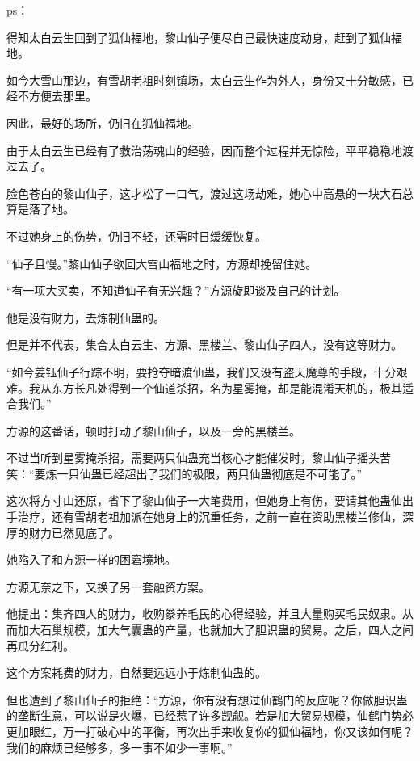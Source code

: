 
\begin{this_body}



ps：

得知太白云生回到了狐仙福地，黎山仙子便尽自己最快速度动身，赶到了狐仙福地。

如今大雪山那边，有雪胡老祖时刻镇场，太白云生作为外人，身份又十分敏感，已经不方便去那里。

因此，最好的场所，仍旧在狐仙福地。

由于太白云生已经有了救治荡魂山的经验，因而整个过程并无惊险，平平稳稳地渡过去了。

脸色苍白的黎山仙子，这才松了一口气，渡过这场劫难，她心中高悬的一块大石总算是落了地。

不过她身上的伤势，仍旧不轻，还需时日缓缓恢复。

“仙子且慢。”黎山仙子欲回大雪山福地之时，方源却挽留住她。

“有一项大买卖，不知道仙子有无兴趣？”方源旋即谈及自己的计划。

他是没有财力，去炼制仙蛊的。

但是并不代表，集合太白云生、方源、黑楼兰、黎山仙子四人，没有这等财力。

“如今姜钰仙子行踪不明，要抢夺暗渡仙蛊，我们又没有盗天魔尊的手段，十分艰难。我从东方长凡处得到一个仙道杀招，名为星雾掩，却是能混淆天机的，极其适合我们。”

方源的这番话，顿时打动了黎山仙子，以及一旁的黑楼兰。

不过当听到星雾掩杀招，需要两只仙蛊充当核心才能催发时，黎山仙子摇头苦笑：“要炼一只仙蛊已经超出了我们的极限，两只仙蛊彻底是不可能了。”

这次将方寸山还原，省下了黎山仙子一大笔费用，但她身上有伤，要请其他蛊仙出手治疗，还有雪胡老祖加派在她身上的沉重任务，之前一直在资助黑楼兰修仙，深厚的财力已然见底了。

她陷入了和方源一样的困窘境地。

方源无奈之下，又换了另一套融资方案。

他提出：集齐四人的财力，收购豢养毛民的心得经验，并且大量购买毛民奴隶。从而加大石巢规模，加大气囊蛊的产量，也就加大了胆识蛊的贸易。之后，四人之间再瓜分红利。

这个方案耗费的财力，自然要远远小于炼制仙蛊的。

但也遭到了黎山仙子的拒绝：“方源，你有没有想过仙鹤门的反应呢？你做胆识蛊的垄断生意，可以说是火爆，已经惹了许多觊觎。若是加大贸易规模，仙鹤门势必更加眼红，万一打破心中的平衡，再次出手来收复你的狐仙福地，你又该如何呢？我们的麻烦已经够多，多一事不如少一事啊。”


\end{this_body}
